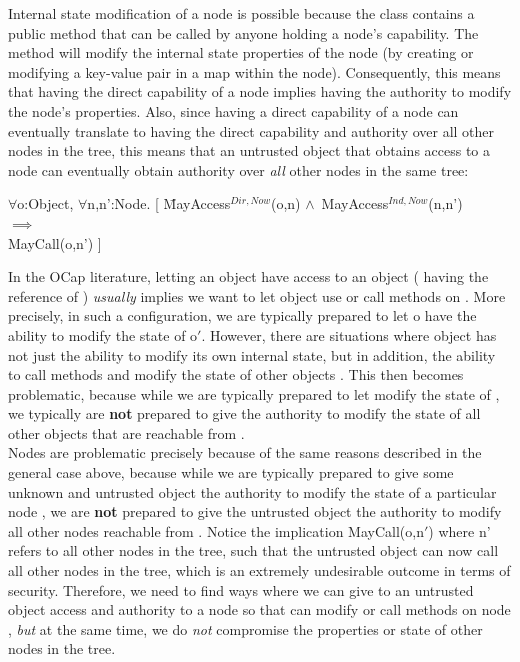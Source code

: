 \documentclass[a4paper,11pt,twoside]{article}
\newenvironment{logic}
{\begin{minipage}[c]{\linewidth}  \sffamily \mdseries \begin{tabbing}}
{\end{tabbing}\end{minipage}\vspace{0.3em}}
\newcommand{\loforall}{$\forall$}
\newcommand{\loand}{$\land$}
\newcommand{\loimplies}{$\implies$}
\begin{document}
Internal state modification of a node is possible because the class  contains a public method  that can be called by anyone holding a node's capability. The method will modify the internal state properties of the node (by creating or modifying a key-value pair in a map within the node). Consequently, this means that having the direct capability of a node implies having the authority to modify the node's properties. Also, since having a direct capability of a node can eventually translate to having the direct capability and authority over all other nodes in the tree, this means that an untrusted object  that obtains access to a node  can eventually obtain authority over \textit{all} other nodes  in the same tree:\\

\begin{logic}
\loforall o:Object, \loforall n,n':Node. [ \=MayAccess$^{Dir,Now}$(o,n) \loand\ MayAccess$^{Ind,Now}$(n,n')\\
\> \loimplies\\
\> MayCall(o,n') ]\\
\end{logic}

In the OCap literature, letting an object  have access to an object  ( having the reference of ) \textit{usually} implies we want to let object  use or call methods on . More precisely, in such a configuration, we are typically prepared to let o have the ability to modify the state of o$'$. However, there are situations where object  has not just the ability to modify its own internal state, but in addition, the ability to call methods  and modify the state of other objects . This then becomes problematic, because while we are typically prepared to let  modify the state of , we typically are \textbf{not} prepared to give  the authority to modify the state of all other objects  that are reachable from .\\

Nodes are problematic precisely because of the same reasons described in the general case above, because while we are typically prepared to give some unknown and untrusted object the authority to modify the state of a particular node , we are \textbf{not} prepared to give the untrusted object the authority to modify all other nodes reachable from . Notice the implication MayCall(o,n$'$) where n' refers to all other nodes in the tree, such that the untrusted object can now call all other nodes in the tree, which is an extremely undesirable outcome in terms of security. Therefore, we need to find ways where we can give to an untrusted object  access and authority to a node  so that  can modify or call methods on node , \textit{but} at the same time, we do \textit{not} compromise the properties or state of other nodes in the tree.
\end{document}
